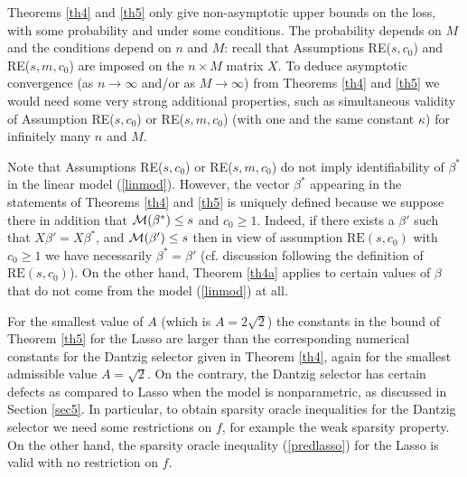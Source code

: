 \documentclass[dvips,aos]{imsart}
\numberwithin{equation}{section}
\theoremstyle{plain}
\def\scm{{\cal M}}
\def\RE#1#2{$\text{RE}(#1,#2)$}
\newcommand{\bb}{\mbox{\boldmath$\beta$}}
\def\bb{\beta}
\begin{document}
\begin{list}{}
{\renewcommand{\makelabel}{\addtocounter{enumi}{1}\arabic{enumi}.}
\setlength{\labelwidth}{1em}
\setlength{\itemindent}{0.51em}
\setlength{\itemsep}{2ex}
\setlength{\leftmargin}{0.15cm}
\setlength{\listparindent}{\parindent}}


\item
Theorems \ref{th4} and \ref{th5} only give non-asymptotic upper
bounds on the loss, with some probability and under some conditions.
The probability depends on $M$ and the conditions depend on $n$ and
$M$: recall that Assumptions RE($s,c_0$) and RE($s,m,c_0$) are
imposed on the $n\times M$ matrix $X$. To deduce asymptotic
convergence (as $n\to \infty$ and/or as $M\to\infty$) from Theorems
\ref{th4} and \ref{th5} we would need some very strong additional
properties, such as simultaneous validity
 of Assumption RE($s,c_0$) or
RE($s,m,c_0$) (with one and the same constant $\kappa$) for
infinitely many $n$ and $M$.

\item

Note that Assumptions RE($s,c_0$) or RE($s,m,c_0$) do not imply
identifiability of $\beta^*$ in the linear model (\ref{linmod}).
However, the vector $\beta^*$ appearing in the statements of
Theorems \ref{th4} and \ref{th5} is uniquely defined because we
suppose there in addition that $\scm(\beta^*)\le s$ and $c_0\ge1$.
Indeed, if there exists a $\beta'$ such that $X\beta'=X\beta^*$, and
$\scm(\beta')\le s$ then in view of assumption \RE {s}{c_0} with
$c_0\geq 1$ we have necessarily $\beta^*=\beta'$ (cf. discussion
following the definition of \RE s{c_0}). On the other hand, Theorem
\ref{th4a} applies to certain values of $\bb$ that do not come from
the model (\ref{linmod}) at all.



\item
For the smallest value of $A$ (which is $A=2\sqrt{2}$) the constants
in the bound of Theorem \ref{th5} for the Lasso are larger than the
corresponding numerical constants for the Dantzig selector given in
Theorem \ref{th4}, again for the smallest admissible value
$A=\sqrt{2}$. On the contrary, the Dantzig selector has certain
defects as compared to Lasso when the model is nonparametric, as
discussed in Section \ref{sec5}. In particular, to obtain sparsity
oracle inequalities for the Dantzig selector we need some
restrictions on $f$, for example the weak sparsity property. On the
other hand, the sparsity oracle inequality (\ref{predlasso}) for the
Lasso is valid with no restriction on $f$.



\end{list}
\end{document}
